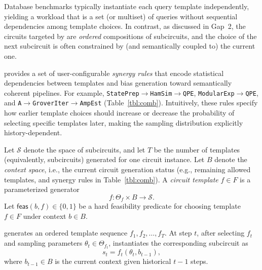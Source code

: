 \medskip
{}
Database benchmarks typically instantiate each query template independently, yielding
a workload that is a set (or multiset) of queries without sequential dependencies among
template choices. In contrast, as discussed in Gap~2, the circuits targeted by \sys are
\emph{ordered} compositions of subcircuits, and the choice of the next subcircuit is often
constrained by (and semantically coupled to) the current one. 

\medskip
{}
\sys provides a set of user-configurable \emph{synergy rules} that encode statistical
dependencies between templates and bias generation toward semantically coherent pipelines. For example,
\texttt{StatePrep}\(\rightarrow\)\texttt{HamSim}\(\rightarrow\)\texttt{QPE}, 
\texttt{ModularExp}\(\rightarrow\)\texttt{QPE}, and \texttt{A}\(\rightarrow\)\texttt{GroverIter}\(\rightarrow\)\texttt{AmpEst} (Table~\ref{tbl:comb}).
Intuitively, these rules specify how earlier template choices should increase or decrease
the probability of selecting specific templates later, making the sampling distribution
explicitly history-dependent.



\medskip
{}
Let \(\mathcal S\) denote the space of subcircuits, and let \(T\) be the number of
templates (equivalently, subcircuits) generated for one circuit instance. Let \(B\) denote the
\emph{context space}, i.e., the current circuit generation status (e.g., remaining allowed templates, and  synergy rules
in Table~\ref{tbl:comb}). 
A \emph{circuit template} \(f\in F\) is a parameterized generator
\begin{equation}
\label{eq:f-definition}
f:\Theta_f \times B \to \mathcal S.
\end{equation}
Let \(\mathsf{feas}(b,f)\in\{0,1\}\) be a hard feasibility predicate
for choosing template \(f\in F\) under context \(b\in B\). 

\sys generates an ordered template sequence \(f_1,f_2,\dots,f_T\). At step \(t\), after
selecting \(f_t\) and sampling parameters \(\theta_t\in\Theta_{f_t}\), \sys instantiates the
corresponding subcircuit as
\begin{equation}
s_t = f_t(\theta_t, b_{t-1}),
\end{equation}
where \(b_{t-1}\in B\) is the current context given historical $t-1$ steps.

